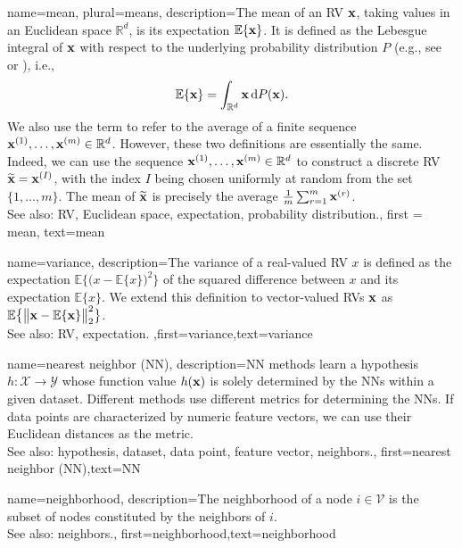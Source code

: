 {
	name={mean}, plural={means},
	description={The  mean of an RV ${\bf x}$, taking 
 values in an Euclidean space $\mathbb{R}^{d}$, is its 
 expectation $\mathbb{E} \{{\bf x}\}$. It is defined as the Lebesgue 
 integral of ${\bf x}$ with respect to the underlying probability distribution $P$ (e.g., see \cite{BillingsleyProbMeasure} or \cite{RudinBookPrinciplesMatheAnalysis}), i.e.,
\[
\mathbb{E} \{{\bf x}\} = \int_{\mathbb{R}^{d}} {\bf x} \, \mathrm{d}P({\bf x}).
\] 
We also use the term to refer to the average of a finite sequence 
${\bf x}^{(1)}, \ldots, {\bf x}^{(m)} \in \mathbb{R}^{d}$. However, 
these two definitions are essentially the same. Indeed, we can use the sequence 
${\bf x}^{(1)}, \ldots, {\bf x}^{(m)} \in \mathbb{R}^{d}$ to construct a 
discrete RV $\widetilde{{\bf x}}={\bf x}^{(I)}$, with the index $I$ being chosen uniformly 
at random from the set $\{1,\ldots,m\}$. The mean of $\widetilde{{\bf x}}$ is 
precisely the average $\frac{1}{m} \sum_{r=1}^{m} {\bf x}^{(r)}$.
			\\ 
		See also: RV, Euclidean space, expectation, probability distribution.}, 
		first = {mean}, text={mean} 
}

{
	name={variance},
	description={The variance of a real-valued RV $x$ is defined as the expectation 
		$\mathbb{E} \big\{ \big( x - \mathbb{E} \{x \} \big)^{2} \big\}$ of the squared difference between $x$ 
		and its expectation $\mathbb{E} \{x \}$. We extend this definition to vector-valued RVs ${\bf x}$ 
		as $\mathbb{E} \big\{ \big\| {\bf x} - \mathbb{E} \{{\bf x} \} \big\|_{2}^{2} \big\}$.
					\\ 
		See also: RV, expectation.} ,first={variance},text={variance} 
}

{
	name={nearest neighbor (NN)},
	description={NN methods learn a hypothesis 
		$h: \mathcal{X} \rightarrow \mathcal{Y}$ whose function value $h({\bf x})$ 
		is solely determined by the NNs within a given dataset. Different 
		methods use different metrics for determining the NNs. If data points 
		are characterized by numeric feature vectors, we can use their Euclidean distances as 
		the metric.
					\\ 
		See also: hypothesis, dataset, data point, feature vector, neighbors.},
	first={nearest neighbor (NN)},text={NN} 
}

{
	name={neighborhood},
	description={The neighborhood of a node $i \in \mathcal{V}$ is 
	the subset of nodes constituted by the neighbors of $i$.
				\\ 
		See also: neighbors.},
	first={neighborhood},text={neighborhood} 
}


